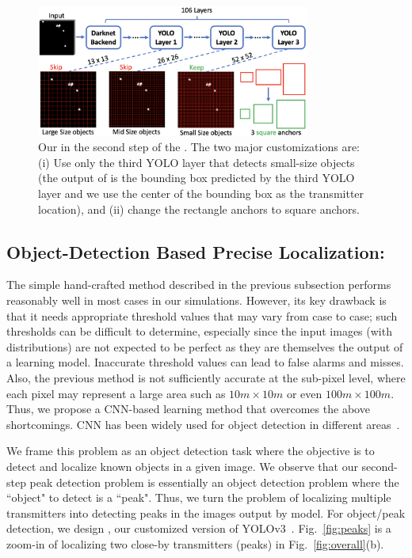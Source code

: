 \begin{figure}
	\centering
	\includegraphics[width=0.8\textwidth]{chapters/wowmom-pmc/figures/yolo.png}
	\caption{Our \yolocust in the second step of the \our. The two major customizations are: 
    (i) Use only the third YOLO layer that detects small-size objects (the output of \yolocust is the bounding box predicted by the third YOLO layer and we use the center of the bounding box as the transmitter location), 
    and (ii) change the rectangle anchors to square anchors.}
	\label{fig:yolo}
\end{figure}

\subsection{Object-Detection Based Precise Localization: \yolocust} 

The simple hand-crafted method described in the previous subsection performs reasonably well in most cases in our simulations. 
However, its key drawback is that it needs appropriate threshold values that may vary from case to case; such thresholds can be difficult to determine, especially since
the input images (with distributions) are not expected to be perfect as they are themselves the output of a learning model.
Inaccurate threshold values can lead to false alarms and misses. 
Also, the previous method is not sufficiently accurate at the sub-pixel level, where
each pixel may represent a large area such as $10m \times 10m$ or even $100m \times 100m$. Thus,
we propose a CNN-based learning method that overcomes the above shortcomings.  
CNN has been widely used for object detection in different areas~\cite{objectdetectionsurvey,alizadeh21}.

We frame this problem as an object detection task where the objective is to detect and localize
known objects in a given image. We observe that our second-step peak detection problem is essentially an object detection problem where the ``object" to detect is a ``peak".
Thus, we turn the \mtl problem of localizing multiple transmitters into detecting 
peaks in the images output by \imgimg model. 
For object/peak detection, we design \yolocust, our customized version of YOLOv3~\cite{yolov3}.
Fig.~\ref{fig:peaks} is a zoom-in of localizing two close-by transmitters (peaks) in Fig.~\ref{fig:overall}(b).

